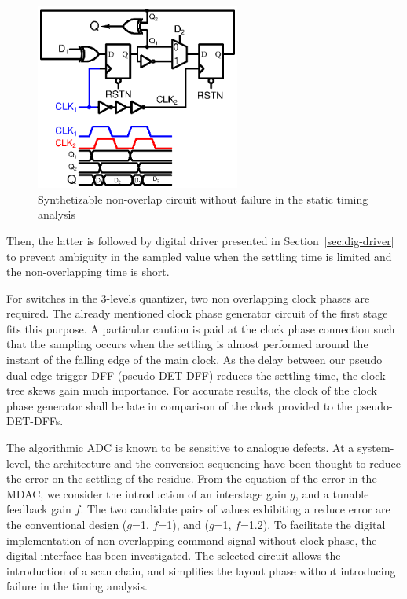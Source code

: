 \begin{figure}[htp]
	\centering
	\includegraphics[width=0.6\textwidth]{Chapter4/Figs/det-dff-hildebrandt.ps}
	\caption{Synthetizable non-overlap circuit without failure in the static timing analysis}
	\label{fig:digital-non-overlap}
\end{figure}

Then, the latter is followed by digital driver presented in Section~\ref{sec:dig-driver} to prevent ambiguity in the sampled value when the settling time is limited and the non-overlapping time is short.

For switches in the 3-levels quantizer, two non overlapping clock phases are required. The already mentioned clock phase generator circuit of the first stage fits this purpose. A particular caution is paid at the clock phase connection such that the sampling occurs when the settling is almost performed around the instant of the falling edge of the main clock. As the delay between our pseudo dual edge trigger DFF (pseudo-DET-DFF) reduces the settling time, the clock tree skews gain much importance. For accurate results, the clock of the clock phase generator shall be late in comparison of the clock provided to the pseudo-DET-DFFs.

The algorithmic ADC is known to be sensitive to analogue defects. At a system-level, the architecture and the conversion sequencing have been thought to reduce the error on the settling of the residue. From the equation of the error in the MDAC, we consider the introduction of an interstage gain $g$, and a tunable feedback gain $f$. The two candidate pairs of values exhibiting a reduce error are the conventional design ($g$=1, $f$=1), and ($g$=1, $f$=1.2).
To facilitate the digital implementation of non-overlapping command signal without clock phase, the digital interface has been investigated. The selected circuit allows the introduction of a scan chain, and simplifies the layout phase without introducing failure in the timing analysis.
\clearpage
